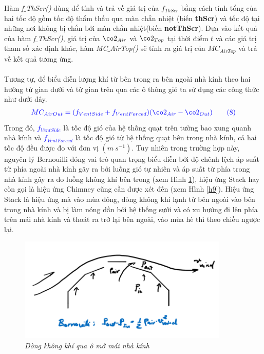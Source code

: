 \documentclass[13pt,a4paper]{article}
\begin{document}
			Hàm \textit{f$\_$ThScr()} dùng để tính và trả về giá trị của $f_{ThScr}$ bằng cách tính tổng của hai tốc độ gồm tốc độ thẩm thấu qua màn chắn nhiệt (biến \textbf{thScr}) và tốc độ tại những nơi không bị chắn bởi màn chắn nhiệt(biến \textbf{notThScr}). Dựa vào kết quả của hàm  \textit{f$\_$ThScr()}, giá trị của $\co2_{Air}$ và $\co2_{Top}$ tại thời điểm $t$ và các giá trị tham số xác định khác, hàm \textit{MC$\_$AirTop()} sẽ tính ra giá trị của $MC_{AirTop}$ và trả về kết quả tương ứng. \\ \\
			 
			Tương tự, để biểu diễn lượng khí  từ bên trong ra bên ngoài nhà kính theo hai hướng từ gian dưới và từ gian trên qua các ô thông gió ta sử dụng các công thức như dưới đây.
			\begin{align}
				\color{blue}
					MC_{AirOut} = (f_{VentSide} + f_{VentForced})(\co2_{Air} - \co2_{Out})
					\tag{8} \label{ct8}
				\color{blue}
			\end{align}
			Trong đó, \textcolor{blue}{$f_{VentSide}$} là tốc độ gió của hệ thống quạt trên tường bao xung quanh nhà kính và \textcolor{blue}{$f_{VentForced}$} là tốc độ gió từ hệ thống quạt bên trong nhà kính, cả hai tốc độ đều được đo với đơn vị $(m\ s^{-1})$. Tuy nhiên trong trường hợp này, nguyên lý Bernouilli đóng vai trò quan trọng biểu diễn bởi độ chênh lệch áp suất từ phía ngoài nhà kính gây ra bởi luồng gió tự nhiên và áp suất từ phía trong nhà kính gây ra do luồng không khí bên trong (xem Hình \ref{h8}), hiệu ứng Stack hay còn gọi là hiệu ứng Chimney cũng cần được xét đến (xem Hình \ref{h9}). Hiệu ứng Stack là hiệu ứng mà vào mùa đông, dòng không khí lạnh từ bên ngoài vào bên trong nhà kính và bị làm nóng dần bởi hệ thống sưởi và có xu hướng đi lên phía trên mái nhà kính và thoát ra trở lại bên ngoài, vào mùa hè thì theo chiều ngược lại.
			\begin{figure}[h!]
				\begin{center}
					\includegraphics[width=10cm]{flow_roof_open.png}
					\caption{\textit{Dòng không khí qua ô mở mái nhà kính}}
					\label{h8}
				\end{center}
			\end{figure}
\end{document}
